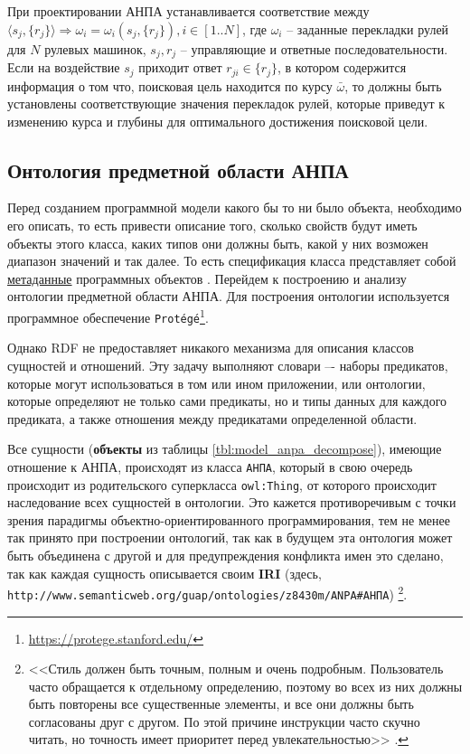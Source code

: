 При проектировании АНПА устанавливается соответствие между $\langle s_j, \{r_j\} \rangle \Rightarrow \omega_i = \omega_i(s_j, \{r_j\}), i\in [1..N]$,
где $\omega_i$ -- заданные перекладки рулей для $N$ рулевых машинок,
$s_j, r_j$ -- управляющие и ответные последовательности.
Если на воздействие $s_j$ приходит ответ $r_{ji} \in \{r_j\}$, в котором содержится информация о том что,
поисковая цель находится по курсу $\bar \omega$, то должны быть установлены соответствующие значения перекладок рулей,
которые приведут к изменению курса и глубины для оптимального достижения поисковой цели.



\subsection{Онтология предметной области АНПА}

Перед созданием программной модели какого бы то ни было объекта, необходимо его описать,
то есть привести описание того, сколько свойств будут иметь объекты этого класса,
каких типов они должны быть, какой у них возможен диапазон значений и так далее.
То есть спецификация класса представляет собой \underline{метаданные} программных объектов \cite{journal:vestnik_spbgu:ivakin}.
Перейдем к построению и анализу онтологии предметной области АНПА.
Для построения онтологии используется программное обеспечение
\texttt{Protégé}\footnote{\url{https://protege.stanford.edu/}}.

%
Однако RDF не предоставляет никакого механизма для описания классов сущностей и
отношений. Эту задачу выполняют словари –- наборы предикатов, которые могут
использоваться в том или ином приложении, или онтологии, которые определяют не только
сами предикаты, но и типы данных для каждого предиката, а также отношения между
предикатами определенной области.

Все сущности (\textbf{объекты} из таблицы \ref{tbl:model_anpa_decompose}), имеющие отношение к АНПА, происходят из класса \texttt{АНПА},
который в свою очередь происходит из родительского суперкласса \texttt{owl:Thing},
от которого происходит наследование всех сущностей в онтологии.
Это кажется противоречивым с точки зрения парадигмы объектно-ориентированного программирования,
тем не менее так принято при построении онтологий, так как в будущем эта онтология может быть объединена с другой
и для предупреждения конфликта имен это сделано, так как каждая сущность описывается своим \textbf{IRI}
(здесь, \texttt{http://www.semanticweb.org/guap/ontologies/z8430m/ANPA\#АНПА}) \cite[раздел 2.1]{journal:vestnik_vgtu:shapkin}\footnote{%
<<Стиль должен быть точным, полным и очень подробным. Пользователь часто обращается к отдельному определению,
    поэтому во всех из них должны быть повторены все существенные элементы, и все они должны быть согласованы друг с другом.
    По этой причине инструкции часто скучно читать, но точность имеет приоритет перед увлекательностью>> \cite[гл.~6]{book:bruks:myth_mount_man}.
}.

